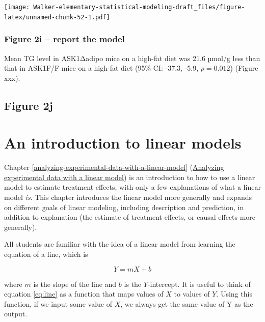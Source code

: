 \documentclass[]{book}
\newenvironment{Shaded}{\begin{snugshade}}{\end{snugshade}}
\newcommand{\NormalTok}[1]{#1}
\begin{document}
\begin{Shaded}
\begin{Highlighting}[]
{\NormalTok{fig_2i_gg}
\end{Highlighting}
\end{Shaded}

\texttt{[image: Walker-elementary-statistical-modeling-draft\_files/figure-latex/unnamed-chunk-52-1.pdf]}

\hypertarget{figure-2i-report-the-model}{%
\subsection{Figure 2i -- report the model}\label{figure-2i-report-the-model}}

Mean TG level in ASK1Δadipo mice on a high-fat diet was 21.6 µmol/g less than that in ASK1F/F mice on a high-fat diet (95\% CI: -37.3, -5.9, \(p = 0.012\)) (Figure xxx).

\hypertarget{figure-2j}{%
\section{Figure 2j}\label{figure-2j}}

\hypertarget{an-introduction-to-linear-models}{%
\chapter{An introduction to linear models}\label{an-introduction-to-linear-models}}

Chapter \ref{analyzing-experimental-data-with-a-linear-model} (\protect\hyperlink{analyzing-experimental-data-with-a-linear-model}{Analyzing experimental data with a linear model}) is an introduction to how to use a linear model to estimate treatment effects, with only a few explanations of what a linear model \emph{is}. This chapter introduces the linear model more generally and expands on different goals of linear modeling, including description and prediction, in addition to explanation (the estimate of treatment effects, or causal effects more generally).

All students are familiar with the idea of a linear model from learning the equation of a line, which is

\begin{equation}
Y = mX + b
\label{eq:line}
\end{equation}

where \(m\) is the slope of the line and \(b\) is the \(Y\)-intercept. It is useful to think of equation \eqref{eq:line} as a function that maps values of \(X\) to values of \(Y\). Using this function, if we input some value of \(X\), we always get the same value of Y as the output.
\end{document}
